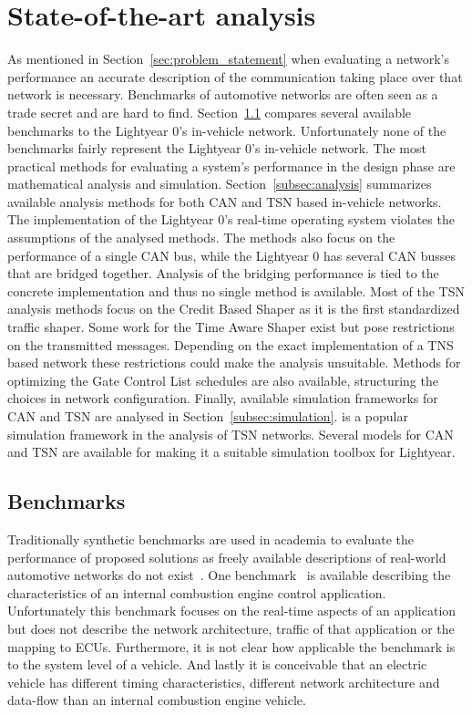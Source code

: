 \section{State-of-the-art analysis}
\label{sec:sota}
As mentioned in Section~\ref{sec:problem_statement} when evaluating a network's performance an accurate description of the communication taking place over that network is necessary. Benchmarks of automotive networks are often seen as a trade secret and are hard to find. Section~\ref{subsec:benchmark} compares several available benchmarks to the Lightyear 0's in-vehicle network. Unfortunately none of the benchmarks fairly represent the Lightyear 0's in-vehicle network. The most practical methods for evaluating a system's performance in the design phase are mathematical analysis and simulation. Section~\ref{subsec:analysis} summarizes available analysis methods for both CAN and TSN based in-vehicle networks. The implementation of the Lightyear 0's real-time operating system violates the assumptions of the analysed methods. The methods also focus on the performance of a single CAN bus, while the Lightyear 0 has several CAN busses that are bridged together. Analysis of the bridging performance is tied to the concrete implementation and thus no single method is available. Most of the TSN analysis methods focus on the Credit Based Shaper as it is the first standardized traffic shaper. Some work for the Time Aware Shaper exist but pose restrictions on the transmitted messages. Depending on the exact implementation of a TNS based network these restrictions could make the analysis unsuitable. Methods for optimizing the Gate Control List schedules are also available, structuring the choices in network configuration. Finally, available simulation frameworks for CAN and TSN are analysed in Section~\ref{subsec:simulation}. \omnet is a popular simulation framework in the analysis of TSN networks. Several models for CAN and TSN are available for \omnet making it a suitable simulation toolbox for Lightyear.

\subsection{Benchmarks} 
\label{subsec:benchmark}
Traditionally synthetic benchmarks are used in academia to evaluate the performance of proposed solutions as freely available descriptions of real-world automotive networks do not exist~\cite{ashjaei2021time}. One benchmark~\cite{kramer2015real} is available describing the characteristics of an internal combustion engine control application. Unfortunately this benchmark focuses on the real-time aspects of an application but does not describe the network architecture, traffic of that application or the mapping to ECUs. Furthermore, it is not clear how applicable the benchmark is to the system level of a vehicle. And lastly it is conceivable that an electric vehicle has different timing characteristics, different network architecture and data-flow than an internal combustion engine vehicle.


